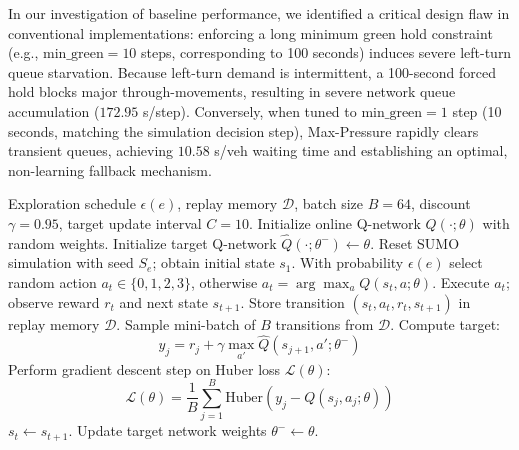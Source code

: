 \documentclass{ieeeaccess}
\begin{document}
In our investigation of baseline performance, we identified a critical design flaw in conventional implementations: enforcing a long minimum green hold constraint (e.g., $\text{min\_green} = 10$ steps, corresponding to 100 seconds) induces severe left-turn queue starvation. Because left-turn demand is intermittent, a 100-second forced hold blocks major through-movements, resulting in severe network queue accumulation ($172.95$ s/step). Conversely, when tuned to $\text{min\_green} = 1$ step (10 seconds, matching the simulation decision step), Max-Pressure rapidly clears transient queues, achieving $10.58$ s/veh waiting time and establishing an optimal, non-learning fallback mechanism.

\begin{algorithm}[!t]
\caption{Deep Q-Network Training with Experience Replay}
\label{alg:dqn_training}
\begin{algorithmic}[1]
\REQUIRE Exploration schedule $\epsilon(e)$, replay memory $\mathcal{D}$, batch size $B=64$, discount $\gamma=0.95$, target update interval $C=10$.
\STATE Initialize online Q-network $Q(\cdot; \theta)$ with random weights.
\STATE Initialize target Q-network $\hat{Q}(\cdot; \theta^-) \leftarrow \theta$.
    \STATE Reset SUMO simulation with seed $S_e$; obtain initial state $s_1$.
        \STATE With probability $\epsilon(e)$ select random action $a_t \in \{0, 1, 2, 3\}$, otherwise $a_t = \arg\max_a Q(s_t, a; \theta)$.
        \STATE Execute $a_t$; observe reward $r_t$ and next state $s_{t+1}$.
        \STATE Store transition $(s_t, a_t, r_t, s_{t+1})$ in replay memory $\mathcal{D}$.
        \STATE Sample mini-batch of $B$ transitions from $\mathcal{D}$.
        \STATE Compute target:
        \begin{equation*}
        y_j = r_j + \gamma \max_{a'} \hat{Q}(s_{j+1}, a'; \theta^-)
        \end{equation*}
        \STATE Perform gradient descent step on Huber loss $\mathcal{L}(\theta)$:
        \begin{equation*}
        \mathcal{L}(\theta) = \frac{1}{B} \sum_{j=1}^B \text{Huber}(y_j - Q(s_j, a_j; \theta))
        \end{equation*}
        \STATE $s_t \leftarrow s_{t+1}$.
    \ENDFOR
        \STATE Update target network weights $\theta^- \leftarrow \theta$.
    \ENDIF
\ENDFOR
\end{algorithmic}
\end{algorithm}
\end{document}
